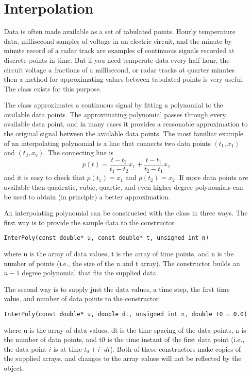 \chapter{Interpolation}
Data is often made available as a set of tabulated points. Hourly temperature data, millisecond samples of voltage in an electric circuit, and the minute by minute record of a radar track are examples of continuous signals recorded at discrete points in time. But if you need temperate data every half hour, the circuit voltage a fractions of a millisecond, or radar tracks at quarter minutes then a method for approximating values between tabulated points is very useful. The  class exists for this purpose.

The  class approximates a continuous signal by fitting a polynomial to the available data points. The approximating polynomial passes through every available data point, and in many cases it provides a reasonable approximation to the original signal between the available data points. The most familiar example of an interpolating polynomial is a line that connects two data points $(t_1,x_1)$ and $(t_2,x_2)$. The connecting line is
\begin{equation*}
p(t)=\frac{t-t_2}{t_1-t_2}x_1 + \frac{t-t_1}{t_2-t_1}x_2
\end{equation*}
and it is easy to check that $p(t_1)=x_1$ and $p(t_2)=x_2$. If more data points are available then quadratic, cubic, quartic, and even higher degree polynomials can be used to obtain (in principle) a better approximation.

An interpolating polynomial can be constructed with the  class in three ways. The first way is to provide the sample data to the  constructor
\begin{verbatim}
InterPoly(const double* u, const double* t, unsigned int n)
\end{verbatim}
where u is the array of data values, t is the array of time points, and n is the number of points (i.e., the size of the u and t array). The constructor builds an $n-1$ degree polynomial that fits the supplied data.

The second way is to supply just the data values, a time step, the first time value, and number of data points to the constructor
\begin{verbatim}
InterPoly(const double* u, double dt, unsigned int n, double t0 = 0.0)
\end{verbatim}
where u is the array of data values, dt is the time spacing of the data points, n is the number of data points, and t0 is the time instant of the first data point (i.e., the data point $i$ is at time $t_0+i \cdot dt$). Both of these constructors make copies of the supplied arrays, and changes to the array values will not be reflected by the  object.

